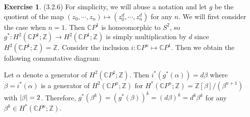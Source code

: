 \documentclass[12pt, psamsfonts]{amsart}
\theoremstyle{definition}
\newtheorem*{exer}{Exercise}
\theoremstyle{remark}
\numberwithin{equation}{section}
\begin{document}
\begin{exer}{(3.2.6)}
  For simplicity, we will abuse a notation and let $g$ be the quotient of the map $(z_0, \cdots, z_n) \mapsto (z_0^d, \cdots, z_n^d)$ for any $n$.
  We will first consider the case when $n = 1$.
  Then $\mathbb{C}P^1$ is homeomorphic to $S^2$, so $g^{\ast}: H^2(\mathbb{C}P^1; \mathbb{Z}) \rightarrow H^2(\mathbb{C}P^1; \mathbb{Z})$ is simply multiplication by $d$ since $H^2(\mathbb{C}P^1; \mathbb{Z}) = \mathbb{Z}$.
  Consider the inclusion $i: \mathbb{C}P^n \mapsto \mathbb{C}P^1$.
  Then we obtain the following commutative diagram:
  \begin{center}
  \end{center}
  Let $\alpha$ denote a generator of $H^2(\mathbb{C}P^1; \mathbb{Z})$.
  Then $i^{\ast}(g^{\ast}(\alpha)) = d\beta$ where $\beta = i^{\ast}(\alpha)$ is a generator of $H^2(\mathbb{C}P^n; \mathbb{Z})$ for $H^{\ast}(\mathbb{C}P^n; \mathbb{Z}) = \mathbb{Z}[\beta]/(\beta^{n + 1})$ with $\abs{\beta} = 2$.
  Therefore, $g^{\ast}(\beta^k) = (g^{\ast}(\beta))^k = (d\beta)^k = d^k\beta^k$ for any $\beta^k \in H^{\ast}(\mathbb{C}P^n; \mathbb{Z})$.
\end{exer}
\end{document}
